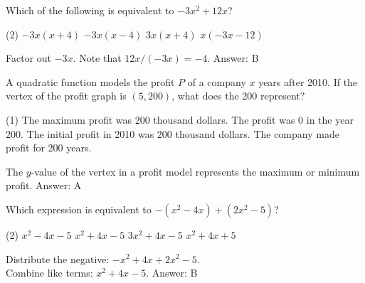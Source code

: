 \documentclass[11pt,paper=a4,answers]{exam}
\begin{document}
\begin{questions}
\vspace{1cm}

\question
Which of the following is equivalent to $-3x^2 + 12x$?
\begin{tasks}(2)
    \task $-3x(x + 4)$ \task $-3x(x - 4)$ \task $3x(x + 4)$ \task $x(-3x - 12)$
\end{tasks}

\begin{solution}
Factor out $-3x$. Note that $12x / (-3x) = -4$.
\vspace{5pt}
Answer: \colorbox{yellow!100}{B}
\end{solution}

\vspace{1cm}

\question
A quadratic function models the profit $P$ of a company $x$ years after 2010. If the vertex of the profit graph is $(5, 200)$, what does the 200 represent?
\begin{tasks}(1)
    \task The maximum profit was 200 thousand dollars.
    \task The profit was 0 in the year 200.
    \task The initial profit in 2010 was 200 thousand dollars.
    \task The company made profit for 200 years.
\end{tasks}

\begin{solution}
The $y$-value of the vertex in a profit model represents the maximum or minimum profit.
\vspace{5pt}
Answer: \colorbox{yellow!100}{A}
\end{solution}

\vspace{1cm}

\question
Which expression is equivalent to $-(x^2 - 4x) + (2x^2 - 5)$?
\begin{tasks}(2)
    \task $x^2 - 4x - 5$ \task $x^2 + 4x - 5$ \task $3x^2 + 4x - 5$ \task $x^2 + 4x + 5$
\end{tasks}

\begin{solution}
Distribute the negative: $-x^2 + 4x + 2x^2 - 5$. \\
Combine like terms: $x^2 + 4x - 5$.
\vspace{5pt}
Answer: \colorbox{yellow!100}{B}
\end{solution}

\vspace{1cm}


\end{questions}
\end{document}
